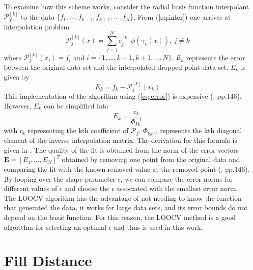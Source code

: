                 To examine how this scheme works, consider the radial basis function interpolant $\mathcal{P}_f^{[k]}$ to the data
                $\{f_1,\ldots,f_{k-1},f_{k+1},\ldots,f_N\}$. From (\ref{eq:inter}) one arrives at interpolation problem
                \begin{equation}\label{eq:loocv}
                    \mathcal{P}_f^{[k]}(x)=\sum\limits_{j=1}^N c_j^{[k]}\phi(\gamma_k(x)), \ j\neq k
                \end{equation}
                where $\mathcal{P}_f^{[k]}(x_i)=f_i$ and $i=\{1,\ldots,k-1,k+1,\ldots,N\}$. $E_k$ represents the error between the original
                data set and the interpolated dropped point data set. $E_k$ is given by
                \begin{equation}\label{eq:error}
                    E_k=f_k-\mathcal{P}_f^{[k]}(x_k)
                \end{equation}
                This implementation of the algorithm using (\ref{eq:error}) is expensive (\cite{item:1}, pp.146). However, $E_k$ can be simplified into
                \begin{equation}
                    E_k = \frac{c_k}{\Phi_{kk}^{-1}}
                \end{equation}
                with $c_k$ representing the kth coefficient of $\mathcal{P}_f$. $\Phi_{kk^{-1}}$ represents the kth diagonal
                element of the inverse interpolation matrix. The derivation for this formula is given in \cite{item:3}. The
                quality of the fit is obtained from the norm of the error vectors $\mathbf{E}=[E_1,\ldots,E_N]^T$ obtained
                by removing one point from the original data and comparing the fit with the known removed value at the
                removed point (\cite{item:1}, pp.146). By looping over the shape parameter $\epsilon$, we can compare
                the error norms for different values of $\epsilon$ and choose the $\epsilon$ associated with the smallest
                error norm.\\

                The LOOCV algorithm has the advantage of not needing to know the function that generated the data, it
                works for large data sets, and its error bounds do not depend on the basic function.
                For this reason, the LOOCV method is a good algorithm for selecting an
                optimal $\epsilon$ and thus is used in this work.\\

    \section{Fill Distance}

